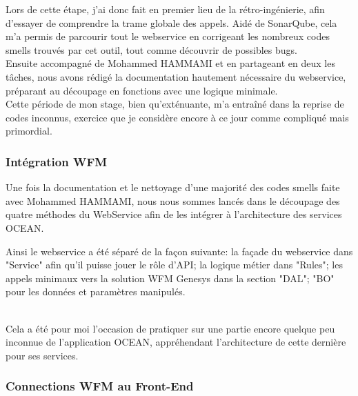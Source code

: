 \documentclass{rapport}
\begin{document}
Lors de cette étape, j'ai donc fait en premier lieu de la rétro-ingénierie, afin d'essayer de comprendre la trame globale des appels. Aidé de SonarQube, cela m'a permis de parcourir tout le webservice en corrigeant les nombreux codes smells trouvés par cet outil, tout comme découvrir de possibles bugs.\\
Ensuite accompagné de Mohammed HAMMAMI et en partageant en deux les tâches, nous avons rédigé la documentation hautement nécessaire du webservice, préparant au découpage en fonctions avec une logique minimale.\\

Cette période de mon stage, bien qu'exténuante, m'a entraîné dans la reprise de codes inconnus, exercice que je considère encore à ce jour comme compliqué mais primordial.

\subsubsection{Intégration WFM}

Une fois la documentation et le nettoyage d'une majorité des codes smells faite avec Mohammed HAMMAMI, nous nous sommes lancés dans le découpage des quatre méthodes du WebService afin de les intégrer à l'architecture des services OCEAN. 

\begin{minipage}{0.35\textwidth}
\end{minipage}
\begin{minipage}{0.55\textwidth}
Ainsi le webservice a été séparé de la façon suivante: la façade du webservice dans "Service" afin qu'il puisse jouer le rôle d'API; la logique métier dans "Rules"; les appels minimaux vers la solution WFM Genesys dans la section "DAL"; "BO" pour les données et paramètres manipulés.
\end{minipage}
\vspace{5mm} %
\\

Cela a été pour moi l'occasion de pratiquer sur une partie encore quelque peu inconnue de l'application OCEAN, appréhendant l'architecture de cette dernière pour ses services.

\subsubsection{Connections WFM au Front-End}
\end{document}
